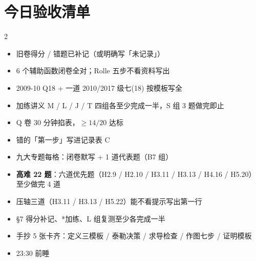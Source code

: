 \documentclass[10pt,a4paper]{ctexart}
\begin{document}
\section*{今日验收清单}
\begin{multicols}{2}
\begin{itemize}
\item[$\square$] 旧卷得分 / 错题已补记（或明确写「未记录」）
\item[$\square$] 6 个辅助函数闭卷全对；Rolle 五步不看资料写出
\item[$\square$] 2009-10 Q18 + 一道 2010/2017 级七(18) 按模板写全
\item[$\square$] 加练讲义 M / L / J / T 四组各至少完成一半，S 组 3 题做完即止
\item[$\square$] Q 卷 30 分钟掐表，$\geq 14/20$ 达标
\item[$\square$] 错的「第一步」写进记录表 C
\item[$\square$] 九大专题每格：闭卷默写 + 1 道代表题（B7 组）
\item[$\square$] \textbf{高难 22 题}：六道优先题（H2.9 / H2.10 / H3.11 / H3.13 / H4.16 / H5.20）至少做完 4 道
\item[$\square$] 压轴三道（H3.11 / H3.13 / H5.22）能不看提示写出第一行
\item[$\square$] §7 得分补记、*加练、L 组复测至少各完成一半
\item[$\square$] 手抄 5 张卡齐：定义三模板 / 泰勒决策 / 求导检查 / 作图七步 / 证明模板
\item[$\square$] 23:30 前睡
\end{itemize}
\end{multicols}

\clearpage
\end{document}
